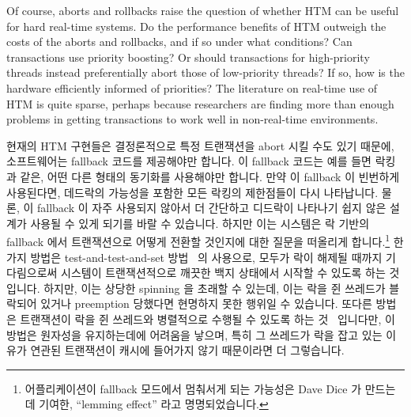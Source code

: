 Of course, aborts and rollbacks raise the question of whether HTM can
be useful for hard real-time systems.
Do the performance benefits of HTM outweigh the costs of the aborts
and rollbacks, and if so under what conditions?
Can transactions use priority boosting?
Or should transactions for high-priority threads instead preferentially
abort those of low-priority threads?
If so, how is the hardware efficiently informed of priorities?
The literature on real-time use of HTM is quite sparse, perhaps because
researchers are finding more than enough problems in getting
transactions to work well in non-real-time environments.
\fi

현재의 HTM 구현들은 결정론적으로 특정 트랜잭션을 abort 시킬 수도 있기 때문에,
소프트웨어는 fallback 코드를 제공해야만 합니다.
이 fallback 코드는 예를 들면 락킹과 같은, 어떤 다른 형태의 동기화를 사용해야만
합니다.
만약 이 fallback 이 빈번하게 사용된다면, 데드락의 가능성을 포함한 모든 락킹의
제한점들이 다시 나타납니다.
물론, 이 fallback 이 자주 사용되지 않아서 더 간단하고 디드락이 나타나기 쉽지
않은 설계가 사용될 수 있게 되기를 바랄 수 있습니다.
하지만 이는 시스템은 락 기반의 fallback 에서 트랜잭션으로 어떻게 전환할
것인지에 대한 질문을 떠올리게 합니다.\footnote{
	어플리케이션이 fallback 모드에서 멈춰서게 되는 가능성은 Dave Dice 가
	만드는데 기여한, ``lemming effect'' 라고 명명되었습니다.}
한가지 방법은 test-and-test-and-set 방법~\cite{Martinez02a} 의 사용으로, 모두가
락이 해제될 때까지 기다림으로써 시스템이 트랜잭션적으로 깨끗한 백지 상태에서
시작할 수 있도록 하는 것입니다.
하지만, 이는 상당한 spinning 을 초래할 수 있는데, 이는 락을 쥔 쓰레드가
블락되어 있거나 preemption 당했다면 현명하지 못한 행위일 수 있습니다.
또다른 방법은 트랜잭션이 락을 쥔 쓰레드와 병렬적으로 수행될 수 있도록 하는
것~\cite{Martinez02a} 입니다만, 이 방법은 원자성을 유지하는데에 어려움을
낳으며, 특히 그 쓰레드가 락을 잡고 있는 이유가 연관된 트랜잭션이 캐시에
들어가지 않기 때문이라면 더 그렇습니다.
\iffalse

